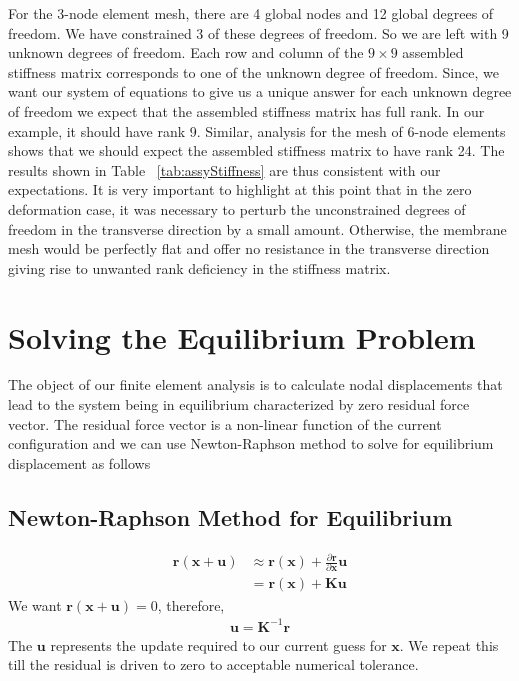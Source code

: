 \documentclass[../main.tex]{subfiles}
\begin{document}
For the 3-node element mesh, there are 4 global nodes and 12 global
degrees of freedom. We have constrained 3 of these degrees of
freedom. So we are left with 9 unknown degrees of freedom. Each row
and column of the $9\times9$ assembled stiffness matrix corresponds to
one of the unknown degree of freedom. Since, we want our system of
equations to give us a unique answer for each unknown degree of
freedom we expect that the assembled stiffness matrix has full
rank. In our example, it should have rank 9. Similar, analysis for the
mesh of 6-node elements shows that we should expect the assembled
stiffness matrix to have rank 24. The results shown in Table
~\ref{tab:assyStiffness} are thus consistent with our expectations. It
is very important to highlight at this point that in the zero
deformation case, it was necessary to perturb the unconstrained
degrees of freedom in the transverse direction by a small
amount. Otherwise, the membrane mesh would be perfectly flat and offer
no resistance in the transverse direction giving rise to unwanted rank
deficiency in the stiffness matrix.
\section{Solving the Equilibrium Problem}
The object of our finite element analysis is to calculate nodal
displacements that lead to the system being in equilibrium
characterized by zero residual force vector. The residual force vector
is a non-linear function of the current configuration and we can use
Newton-Raphson method to solve for equilibrium displacement as follows
\subsection{Newton-Raphson Method for Equilibrium}
\begin{align*}
  \mathbf{r}(\mathbf{x+\mathbf{u}}) &\approx \mathbf{r}(\mathbf{x}) + \frac{\partial\mathbf{r}}{\partial\mathbf{x}}\mathbf{u} \\
                                    &= \mathbf{r}(\mathbf{x}) + \mathbf{K}\mathbf{u}
\end{align*}
We want $ \mathbf{r}(\mathbf{x+\mathbf{u}}) = 0$, therefore,
\begin{align*}
  \mathbf{u} = \mathbf{K}^{-1}\mathbf{r}
\end{align*}
The $\mathbf{u}$ represents the update required to our current guess
for $\mathbf{x}$. We repeat this till the residual is driven to zero
to acceptable numerical tolerance.
\end{document}
